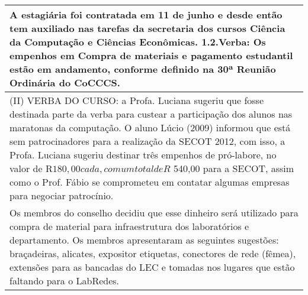 \begin{longtable}{|p{17.5cm}|}
 \\ \hline 
A estagiária foi contratada em 11 de junho e desde então tem auxiliado nas tarefas da secretaria dos cursos Ciência da Computação e Ciências Econômicas. 1.2.Verba: Os empenhos em Compra de materiais e pagamento estudantil estão em andamento, conforme definido na 30ª Reunião Ordinária do CoCCCS.

 \\ \hline 
(II) VERBA DO CURSO: a Profa. Luciana sugeriu que fosse destinada parte da verba para custear a participação dos alunos nas maratonas da computação. O aluno Lúcio (2009) informou que está sem patrocinadores para a realização da SECOT 2012, com isso, a Profa. Luciana sugeriu destinar três empenhos de pró-labore, no valor de R$ 180,00 cada, com um total de R$ 540,00 para a SECOT, assim como o Prof. Fábio se comprometeu em contatar algumas empresas para negociar patrocínio.

 \\ \hline 
Os membros do conselho decidiu que esse dinheiro será utilizado para compra de material para infraestrutura dos laboratórios e departamento. Os membros apresentaram as seguintes sugestões: braçadeiras, alicates, expositor etiquetas, conectores de rede (fêmea), extensões para as bancadas do LEC e tomadas nos lugares que estão faltando para o LabRedes.

 \\ \hline 

\end{longtable} 




